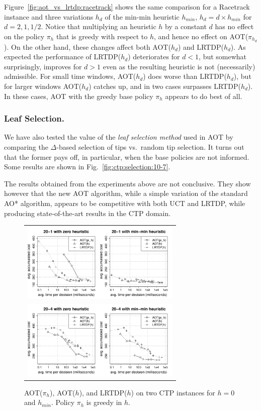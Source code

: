 \documentclass[letterpaper]{article}
\begin{document}
Figure~\ref{fig:aot_vs_lrtdp:racetrack} shows the same  comparison for 
a Racetrack instance and three variations $h_d$ of the min-min heuristic
$h_{min}$, $h_d = d \times h_{min}$ for $d=2,1,1/2$. Notice that multiplying
an heuristic $h$ by a constant $d$ has no effect on the policy $\pi_h$
that is greedy with respect to  $h$, and hence no effect on AOT($\pi_{h_d}$).
On the other hand, these changes  affect both AOT($h_d$) and LRTDP($h_d$). 
As expected the performance of LRTDP($h_d$) deteriorates  for  $d < 1$, 
but somewhat surprisingly,  improves for $d > 1$ even as the resulting heuristic
is not (necessarily) admissible.   For small time windows, AOT($h_d$) does worse than LRTDP($h_d$),
but for larger   windows AOT($h_d$) catches up,  and in two cases surpasses  LRTDP($h_d$).
In these cases, AOT with the greedy  base policy $\pi_h$ appears to do  best of all.


\subsubsection{Leaf Selection.} We have also  tested the  value of  the \emph{leaf selection method} used in
AOT by comparing the $\Delta$-based selection of tips vs.\  random tip selection.
It turns out that the former pays off, in particular, when the base policies
are not informed. Some results are shown in Fig.~\ref{fig:ctp:selection:10-7}. 

The results obtained from the experiments above are not conclusive. They show however 
that the new AOT algorithm, while a simple variation of the standard AO* algorithm, appears
to be competitive with both UCT and LRTDP, while producing state-of-the-art results
in the  CTP domain.

\begin{figure}
\centering
\begin{tabular}{c}
\includegraphics[width=3in,clip=on,trim=.75cm 0cm 1.5cm 1cm]{ctp_aot_vs_lrtdp_20_1.pdf} \\
\includegraphics[width=3in,clip=on,trim=.75cm .7cm 1.5cm 1cm]{ctp_aot_vs_lrtdp_20_4.pdf}
\end{tabular}
\caption{AOT($\pi_h$), AOT($h$), and LRTDP($h$) on two CTP instances
  for $h=0$ and $h_{min}$. Policy $\pi_h$ is greedy in $h$.}
\label{fig:aot_vs_lrtdp:ctp}
\end{figure}
\end{document}
